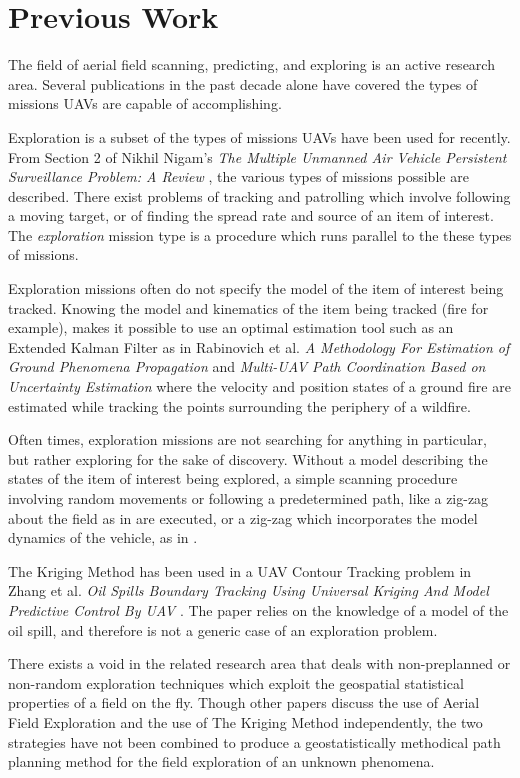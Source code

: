 
\chapter{Previous Work}
The field of aerial field scanning, predicting, and exploring is an active research area. Several publications in the past decade alone have covered the types of missions UAVs are capable of accomplishing.

Exploration is a subset of the types of missions UAVs have been used for recently. From Section 2 of Nikhil Nigam's \textit{The Multiple Unmanned Air Vehicle Persistent Surveillance Problem: A Review} \cite{nigam:missions}, the various types of missions possible are described. There exist problems of tracking and patrolling which involve following a moving target, or of finding the spread rate and source of an item of interest. The \textit{exploration} mission type is a procedure which runs parallel to the these types of missions. 

Exploration missions often do not specify the model of the item of interest being tracked. Knowing the model and kinematics of the item being tracked (fire for example), makes it possible to use an optimal estimation tool such as an Extended Kalman Filter as in Rabinovich et al. \textit{A Methodology For Estimation of Ground Phenomena Propagation} \cite{sharon:uav_est} and \textit{Multi-UAV Path Coordination Based on Uncertainty Estimation} \cite{sharon:uav_uncert} where the velocity and position states of a ground fire are estimated while tracking the points surrounding the periphery of a wildfire.

Often times, exploration missions are not searching for anything in particular, but rather exploring for the sake of discovery. Without a model describing the states of the item of interest being explored, a simple scanning procedure involving random movements or following a predetermined path, like a zig-zag about the field as in \cite{semsch:uav_zig} are executed, or a zig-zag which incorporates the model dynamics of the vehicle, as in \cite{nigam:zigzag}. 

The Kriging Method has been used in a UAV Contour Tracking problem in Zhang et al. \textit{Oil Spills Boundary Tracking Using Universal Kriging And Model Predictive Control By UAV} \cite{zhang:oil_krig}. The paper relies on the knowledge of a model of the oil spill, and therefore is not a generic case of an exploration problem. 

There exists a void in the related research area that deals with non-preplanned or non-random exploration techniques which exploit the geospatial statistical properties of a field on the fly. Though other papers discuss the use of Aerial Field Exploration and the use of The Kriging Method independently, the two strategies have not been combined to produce a geostatistically methodical path planning method for the field exploration of an unknown phenomena.